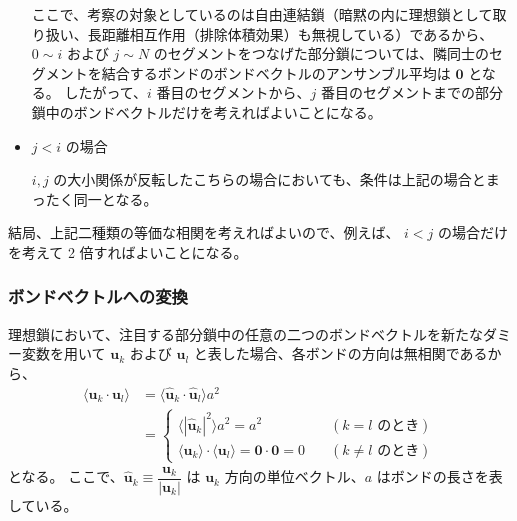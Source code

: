 \documentclass[uplatex,dvipdfmx,a4paper,11pt, titlepage]{jsarticle}
\begin{document}
\begin{appendix}
\begin{itemize}
ここで、考察の対象としているのは自由連結鎖（暗黙の内に理想鎖として取り扱い、長距離相互作用（排除体積効果）も無視している）であるから、$0 \sim i$ および $j \sim N$ のセグメントをつなげた部分鎖については、隣同士のセグメントを結合するボンドのボンドベクトルのアンサンブル平均は $\bm{0}$ となる。
したがって、$i$ 番目のセグメントから、$j$ 番目のセグメントまでの部分鎖中のボンドベクトルだけを考えればよいことになる。

\item
$j < i$ の場合


$i,j$ の大小関係が反転したこちらの場合においても、条件は上記の場合とまったく同一となる。
\end{itemize}

結局、上記二種類の等価な相関を考えればよいので、例えば、 $i < j$ の場合だけを考えて 2 倍すればよいことになる。

\subsubsection{ボンドベクトルへの変換}

理想鎖において、注目する部分鎖中の任意の二つのボンドベクトルを新たなダミー変数を用いて $\bm{u}_k$ および $\bm{u}_l$ と表した場合、各ボンドの方向は無相関であるから、
\begin{align*}
\langle \bm{u}_k \cdot \bm{u}_l \rangle 
	&= \langle \bm{\hat{u}}_k \cdot \bm{\hat{u}}_l \rangle a^2 \\
	&=
\begin{cases}
\langle |\bm{\hat{u}}_k |^2 \rangle a^2 = a^2	&\quad (\text{$k = l$ のとき}) \\
\langle \bm{u}_k \rangle \cdot \langle \bm{u}_l \rangle = \bm{0}\cdot\bm{0} = 0	&\quad(\text{$k \neq l$ のとき})
\end{cases}
\end{align*}
となる。
ここで、$\bm{\hat{u}}_k \equiv \dfrac{\bm{u}_k}{|\bm{u}_k|}$ は $\bm{u}_k$ 方向の単位ベクトル、$a$ はボンドの長さを表している。


\end{appendix}
\end{document}
